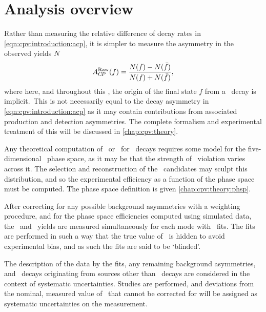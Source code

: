 \section{Analysis overview}
\label{chap:cpv:introduction:overview}

Rather than measuring the relative difference of decay rates in 
\cref{eqn:cpv:introduction:acp}, it is simpler to measure the asymmetry in the 
observed yields $N$
\begin{equation}
  A_{C\!P}^{\textnormal{Raw}}(f) = \frac{N(f) - N(\bar{f})}{N(f) + N(\bar{f})},
  \label{eqn:cpv:introduction:araw}
\end{equation}
where here, and throughout this , the origin of the final 
state $f$ from a \PLambdac\ decay is implicit.\footnotemark\
This is not necessarily equal to the decay asymmetry in 
\cref{eqn:cpv:introduction:acp} as it may contain contributions from associated 
production and detection asymmetries.
The complete formalism and experimental treatment of this will be discussed in 
\cref{chap:cpv:theory}.


Any theoretical computation of \ACP\ or \dACP\ for \LcTophh\ decays requires 
some model for the five-dimensional \phh\ phase space, as it may be that the 
strength of \CP\ violation varies across it.
The selection and reconstruction of the \PLambdac\ candidates may sculpt this 
distribution, and so the experimental efficiency as a function of the phase 
space must be computed.
The phase space definition is given \cref{chap:cpv:theory:phsp}.

After correcting for any possible background asymmetries with a weighting 
procedure, and for the phase space efficiencies computed using simulated data, 
the \PLambdac\ and \APLambdac\ yields are measured simultaneously for each mode 
with \chisq\ fits.
The fits are performed in such a way that the true value of \ARaw\ is hidden to 
avoid experimental bias, and as such the fits are said to be `blinded'.

The description of the data by the fits, any remaining background asymmetries, 
and \PLambdac\ decays originating from sources other than \PLambdab\ decays are 
considered in the context of systematic uncertainties.
Studies are performed, and deviations from the nominal, measured value of 
\dACP\ that cannot be corrected for will be assigned as systematic 
uncertainties on the measurement.

